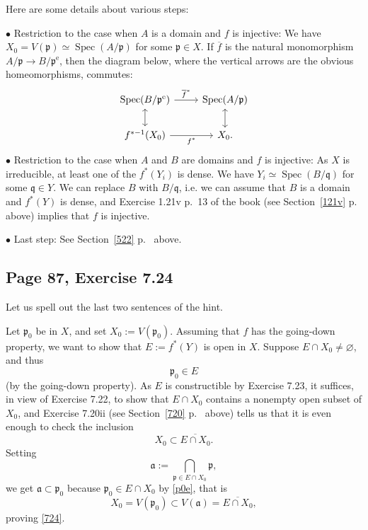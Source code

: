 \documentclass[parskip=half,fontsize=12pt]{scrartcl}%
\newcommand{\oo}{\operatorname}\newcommand{\ooo}{\operatorname*}
\newcommand{\mf}{\mathfrak}
\newcommand{\aaa}{\mf a}
\newcommand{\ppp}{\mf p}
\newcommand{\qqq}{\mf q}
\newcommand{\bu}{\bullet}
\newcommand{\Spec}{\operatorname{Spec}}\newcommand{\Sp}{\operatorname{Spec}}
\begin{document}
Here are some details about various steps:

$\bu$ Restriction to the case when $A$ is a domain and $f$ is injective: We have $X_0=V(\ppp)\simeq\Spec(A/\ppp)$ for some $\ppp\in X$. If $\overline f$ is the natural monomorphism $A/\ppp\to B/\ppp^{\oo e}$, then the diagram below, where the vertical arrows are the obvious homeomorphisms, commutes: 
$$
\begin{tikzcd}
\Spec(B/\ppp^{\oo e})\ar[r,"\overline f^*"]\ar[d,leftrightarrow]&\Spec(A/\ppp)\ar[d,leftrightarrow]\\ 
f^{*-1}(X_0)\ar[r,"f^*"']&X_0.
\end{tikzcd}
$$ 
$\bu$ Restriction to the case when $A$ and $B$ are domains and $f$ is injective: As $X$ is irreducible, at least one of the $f^*(Y_i)$ is dense. We have $Y_i\simeq\Spec(B/\qqq)$ for some $\qqq\in Y$. We can replace $B$ with $B/\qqq$, i.e. we can assume that $B$ is a domain and $f^*(Y)$ is dense, and Exercise 1.21v p.~13 of the book (see Section~\ref{121v} p.~\pageref{121v} above) implies that $f$ is injective. 

$\bu$ Last step: See Section~\ref{522} p.~\pageref{522} above.

\subsection{Page 87, Exercise 7.24}%

Let us spell out the last two sentences of the hint.

Let $\ppp_0$ be in $X$, and set $X_0:=V(\ppp_0)$. Assuming that $f$ has the going-down property, we want to show that $E:=f^*(Y)$ is open in $X$. Suppose $E\cap X_0\ne\varnothing$, and thus 
\begin{equation}\label{p0e}
\ppp_0\in E
\end{equation} 
(by the going-down property). As $E$ is constructible by Exercise 7.23, it suffices, in view of Exercise 7.22, to show that $E\cap X_0$ contains a nonempty open subset of $X_0$, and Exercise 7.20ii (see Section~\ref{720} p.~\pageref{720} above) tells us that it is even enough to check the inclusion 
\begin{equation}\label{724}
X_0\subset\overline{E\cap X_0}.
\end{equation} 
Setting 
$$
\aaa:=\bigcap_{\ppp\in E\cap X_0}\ppp,
$$ 
we get $\aaa\subset\ppp_0$ because $\ppp_0\in E\cap X_0$ by \eqref{p0e}, that is 
$$
X_0=V(\ppp_0)\subset V(\aaa)=\overline{E\cap X_0},
$$ 
proving \eqref{724}.
\end{document}
